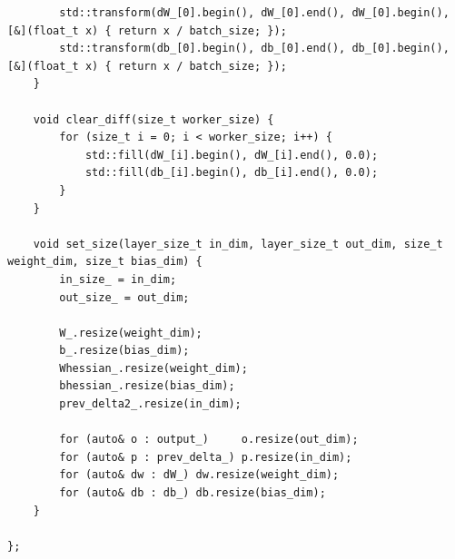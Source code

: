 \documentclass[utf8,usehyperref,14pt]{G7-32}
\begin{document}
\begin{lstlisting}
        std::transform(dW_[0].begin(), dW_[0].end(), dW_[0].begin(), [&](float_t x) { return x / batch_size; });
        std::transform(db_[0].begin(), db_[0].end(), db_[0].begin(), [&](float_t x) { return x / batch_size; });
    }

    void clear_diff(size_t worker_size) {
        for (size_t i = 0; i < worker_size; i++) {
            std::fill(dW_[i].begin(), dW_[i].end(), 0.0);
            std::fill(db_[i].begin(), db_[i].end(), 0.0);
        }
    }

    void set_size(layer_size_t in_dim, layer_size_t out_dim, size_t weight_dim, size_t bias_dim) {
        in_size_ = in_dim;
        out_size_ = out_dim;

        W_.resize(weight_dim);
        b_.resize(bias_dim);
        Whessian_.resize(weight_dim);
        bhessian_.resize(bias_dim);
        prev_delta2_.resize(in_dim);

        for (auto& o : output_)     o.resize(out_dim);
        for (auto& p : prev_delta_) p.resize(in_dim);
        for (auto& dw : dW_) dw.resize(weight_dim);
        for (auto& db : db_) db.resize(bias_dim);
    }

};
\end{lstlisting}



\end{document}
